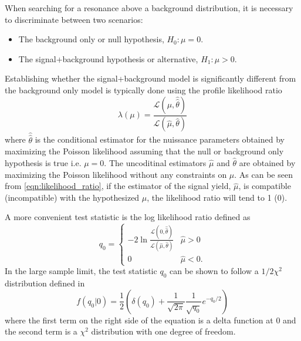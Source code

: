 When searching for a resonance above a background distribution, it is 
necessary to discriminate between two scenarios:
\begin{itemize}
    \item The background only or null hypothesis, $H_{0}: \mu = 0$.
    \item The signal+background hypothesis or alternative, $H_{1}: \mu > 0$.
\end{itemize}
Establishing whether the signal+background model is significantly different 
from the background only model is typically done using the profile likelihood
ratio
\begin{equation}
    \lambda(\mu) = \frac{\mathcal{L}(\mu, \hat{\hat{\theta}})}{\mathcal{L}(\hat{\mu}, \hat{\theta})}
    \label{eqn:likelihood_ratio}
\end{equation}
where $\hat{\hat{\theta}}$ is the conditional estimator for the nuissance parameters 
obtained by maximizing the Poisson likelihood assuming that the null or 
background only hypothesis is true i.e. $\mu = 0$. The uncoditinal estimators $\hat{\mu}$ 
and $\hat{\theta}$ are obtained by maximizing the Poisson likelihood without
any constraints on $\mu$.
As can be seen from \ref{eqn:likelihood_ratio}, 
if the estimator of the signal yield, $\hat{\mu}$, is compatible (incompatible)
with the hypothesized $\mu$, the likelihood ratio will tend to 1 (0).

A more convenient test statistic is the log likelihood ratio defined as
\begin{equation}
    q_0 = \begin{cases}
            -2 \ln \frac{\mathcal{L}(0, \hat{\hat{\theta}})}{\mathcal{L}(\hat{\mu}, \hat{\theta})} 
            & \hat{\mu} > 0 \\
             0  & \hat{\mu} < 0.
        \end{cases}
\end{equation}
In the large sample limit, the test statistic
$q_0$ can be shown to follow a $1/2\chi^2$ distribution defined in \cite{Cowan:2010js}  
\begin{equation}
    f(q_{0}|0) = \frac{1}{2} \left(\delta(q_{0}) + \frac{1}{\sqrt{2\pi}}\frac{1}{\sqrt{q_{0}}}e^{-q_0/2} \right)
    \label{eqn:half_chi}
\end{equation}
where the first term on the right side of the equation is a delta function at 0
and the second term is a $\chi^2$ distribution with one degree of freedom. 

